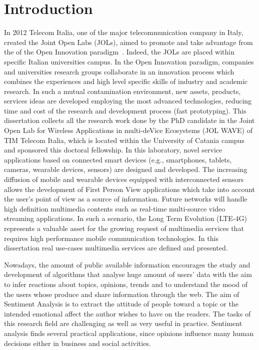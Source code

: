 \chapter{Introduction}
In 2012 Telecom Italia, one of the major telecommunication company in Italy, created the Joint Open Labs (JOLs), aimed to promote and take advantage from the of the Open Innovation paradigm~\cite{chesbrough2006open}. Indeed, the JOLs are placed within specific Italian universities campus. In the Open Innovation paradigm, companies and universities research groups collaborate in an innovation process which combines the experiences and high level specific skills of industry and academic research.
In such a mutual contamination environment, new assets, products, services ideas are developed employing the most advanced
technologies, reducing time and cost of the research and development process (fast prototyping).
This dissertation collects all the research work done by the PhD candidate in the Joint Open Lab for Wireless Applications in multi-deVice Ecosystems (JOL WAVE) of TIM Telecom Italia, which is located within the University of Catania campus and sponsored this doctoral fellowship. In this laboratory, novel service applications based on connected smart devices (e.g., smartphones, tablets, cameras, wearable devices, sensors) are designed and developed.
The increasing diffusion of mobile and wearable devices equipped with interconnected sensors allows the development of First Person View applications which take into account the user's point of view as a source of information.
Future networks will handle high definition multimedia contents such as real-time multi-source video streaming applications. In such a scenario, the Long Term Evolution (LTE-4G)~\cite{sesia2011lte} represents a valuable asset for the growing request of multimedia services that requires high performance mobile communication technologies.
In this dissertation real use-cases multimedia services are defined and presented. %

Nowadays, the amount of public available information encourages the study and development of algorithms that analyse huge amount of users' data with the aim to infer reactions about topics, opinions, trends and to understand the mood of the users whose produce and share information through the web. The aim of Sentiment Analysis is to extract the attitude of people toward a topic or the intended emotional affect the author wishes to have on the readers. The tasks of this research field are challenging as well as very useful in practice. Sentiment analysis finds several practical applications, since opinions influence many human decisions either in business and social activities.  

